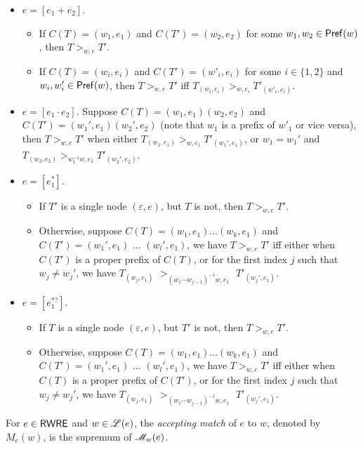 \begin{definition}
\begin{itemize}
  		\item $e = [e_1 + e_2]$.
  		\begin{itemize}
  			\item If $C (T) = (w_1, e_1)$ and $C (T') = (w_2, e_2)$ for some $w_1, w_2 \in \mathsf{Pref}(w)$, then $T >_{w,e} T'$.
%  			
  			\item If $C (T) = (w_i, e_i)$ and $C (T') = (w'_i, e_i)$ for some $i \in \{ 1,
  			2 \}$ and $w_i, w'_i \in \mathsf{Pref}(w)$, then $T >_{w,e} T'$ iff $T_{(w_i, e_i)} >_{w, e_i} T'_{(w'_i, e_i)}$.
  		\end{itemize}
  		\item $e = [e_1 \cdot e_2]$. Suppose $C (T) = (w_1, e_1) (w_2, e_2)$ and $C (T') =
  		(w_1', e_1) (w_2', e_2)$ (note that $w_1$ is a prefix of $w'_1$ or vice versa), then $T >_{w,e} T'$ when either $T_{(w_1, e_1)} >_{w, e_1}
  		T'_{(w_1', e_1)}$, or $w_1 = w_1'$ and $T_{(w_2, e_2)} >_{w_1^{-1}w, e_2} T'_{(w_2', e_2)}$. 
%  		
  		\item $e = [e_1^{\ast}]$. 
		\begin{itemize}
		\item If $T' $ is  a single node $(\varepsilon, e)$, but $T$ is not, then $T >_{w, e} T'$.
  		\item Otherwise, suppose $C(T) = (w_1, e_1) \ldots (w_k, e_1)$ and $C (T') =
  		(w_1', e_1)$ $\ldots$ $(w_l', e_1)$, we have $T >_{w,e} T'$ iff either when $C (T')$
  		is a proper prefix of $C (T)$, or for the first index $j$ such that $w_j
  		\neq w_j'$, we have $T_{(w_j, e_1)}$ $>_{(w_1\cdots w_{j-1})^{-1}w, e_1}$ $T'_{(w_j', e_1)}$.
		\end{itemize}
%
  		\item $e = [e_1^{\ast?}]$. 
		\begin{itemize}
		\item If $T$ is  a single node  $(\varepsilon, e)$, but $T'$ is not, then $T >_{w, e} T'$.
  		\item Otherwise, suppose $C(T) = (w_1, e_1) \ldots (w_k, e_1)$ and $C (T') =
  		(w_1', e_1)$ $\ldots$ $(w_l', e_1)$, we have $T >_{w,e} T'$ iff either when $C (T)$
  		is a proper prefix of $C (T')$, or for the first index $j$ such that $w_j
  		\neq w_j'$, we have $T_{(w_j, e_1)}$ $>_{(w_1\cdots w_{j-1})^{-1}w, e_1}$ $T'_{(w_j', e_1)}$.
		\end{itemize}
  	\end{itemize}
  	
  	For $e \in {\sf RWRE}$ and $w \in \mathscr{L}(e)$, the \emph{accepting match} of $e$ to $w$, denoted by $M_e(w)$, is the supremum of $\mathscr{M}_w(e)$.
  	

\end{definition}
